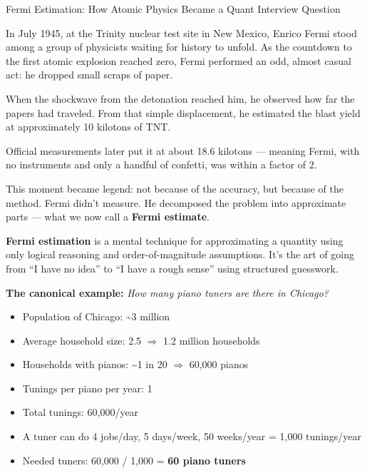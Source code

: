 \begin{HistoricalSidebar}{Fermi Estimation: How Atomic Physics Became a Quant Interview Question}

  In July 1945, at the Trinity nuclear test site in New Mexico, Enrico Fermi stood among a group of physicists waiting for 
  history to unfold.  
  As the countdown to the first atomic explosion reached zero, Fermi performed an odd, almost casual act: he dropped small 
  scraps of paper.
  
  \medskip
  
  When the shockwave from the detonation reached him, he observed how far the papers had traveled.  
  From that simple displacement, he estimated the blast yield at approximately 10 kilotons of TNT.
  
  \medskip
  
  Official measurements later put it at about 18.6 kilotons — meaning Fermi, with no instruments and only a handful of confetti, 
  was within a factor of 2.
  
  \medskip
  
  This moment became legend: not because of the accuracy, but because of the method.  
  Fermi didn’t measure. He decomposed the problem into approximate parts — what we now call a \textbf{Fermi estimate}.
  
  \medskip
  
  \textbf{Fermi estimation} is a mental technique for approximating a quantity using only logical reasoning and 
  order-of-magnitude assumptions.  
  It’s the art of going from ``I have no idea'' to ``I have a rough sense'' using structured guesswork.
  
  \medskip
  
  \textbf{The canonical example:}  
  \textit{How many piano tuners are there in Chicago?}

  \medskip
  
  \begin{itemize}
    \item Population of Chicago: \textasciitilde3 million  
    \item Average household size: 2.5 $\Rightarrow$ 1.2 million households  
    \item Households with pianos: \textasciitilde1 in 20 $\Rightarrow$ 60,000 pianos  
    \item Tunings per piano per year: 1  
    \item Total tunings: 60,000/year  
    \item A tuner can do 4 jobs/day, 5 days/week, 50 weeks/year = 1,000 tunings/year  
    \item Needed tuners: 60,000 / 1,000 = \textbf{60 piano tuners}
  \end{itemize}
  

\end{HistoricalSidebar}

